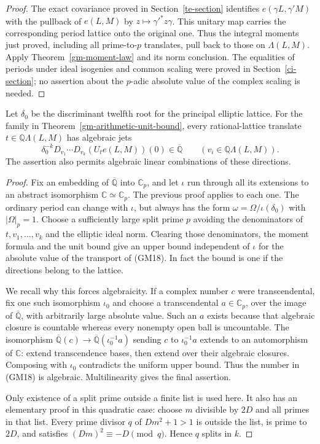 \begin{proof}
The exact covariance proved in Section~\ref{te-section}
identifies $e(\gamma L,\gamma'M)$ with the pullback of
$e(L,M)$ by $z\mapsto\gamma'^*z\gamma$.  This unitary
map carries the corresponding period lattice onto the original
one.  Thus the integral moments just proved, including all
prime-to-$p$ translates, pull back to those on $\Lambda(L,M)$.
Apply Theorem~\ref{gm-moment-law} and its norm conclusion.
The equalities of periods under ideal isogenies and common
scaling were proved in Section~\ref{ci-section}; no assertion
about the $p$-adic absolute value of the complex scaling is
needed.
\end{proof}

\begin{corollary}\label{gm-algebraic-jets}
Let $\delta_0$ be the discriminant twelfth root for the
principal elliptic lattice.  For the family in
Theorem~\ref{gm-arithmetic-unit-bound}, every rational-lattice
translate $t\in\mathbb Q\Lambda(L,M)$ has algebraic jets
\[
       \delta_0^{-k}D_{v_1}\cdots D_{v_k}
                           (U_te(L,M))(0)\in\overline{\mathbb Q}
       \qquad(v_i\in\mathbb Q\Lambda(L,M)).                 \tag{GM18}
\]
The assertion also permits algebraic linear combinations of
these directions.
\end{corollary}
\begin{proof}
Fix an embedding of $\overline{\mathbb Q}$ into
$\mathbb C_p$, and let $\iota$ run through all its extensions
to an abstract isomorphism $\mathbb C\simeq\mathbb C_p$.
The previous proof applies to each one.  The ordinary period
can change with $\iota$, but always has the form
$\omega=\Omega/\iota(\delta_0)$ with $|\Omega|_p=1$.
Choose a sufficiently large split prime $p$ avoiding the
denominators of $t,v_1,\ldots,v_k$ and the elliptic ideal
norm.  Clearing those denominators, the moment formula and
the unit bound give an upper bound independent of $\iota$
for the absolute value of the transport of (GM18).  In fact
the bound is one if the directions belong to the lattice.

We recall why this forces algebraicity.  If a complex number
$c$ were transcendental, fix one such isomorphism $\iota_0$
and choose a transcendental $a\in\mathbb C_p$, over the
image of $\overline{\mathbb Q}$, with arbitrarily large
absolute value.  Such an $a$ exists because that algebraic
closure is countable whereas every nonempty open ball is
uncountable.  The isomorphism
$\overline{\mathbb Q}(c)\to
\overline{\mathbb Q}(\iota_0^{-1}a)$ sending $c$ to
$\iota_0^{-1}a$ extends to an automorphism of $\mathbb C$:
extend transcendence bases, then extend over their algebraic
closures.  Composing with $\iota_0$ contradicts the uniform
upper bound.  Thus the number in (GM18) is algebraic.
Multilinearity gives the final assertion.

Only existence of a split prime outside a finite list is
used here.  It also has an elementary proof in this quadratic
case: choose $m$ divisible by $2D$ and all primes in that
list.  Every prime divisor $q$ of $Dm^2+1>1$ is outside
the list, is prime to $2D$, and satisfies
$(Dm)^2\equiv-D\pmod q$.  Hence $q$ splits in $k$.
\end{proof}

